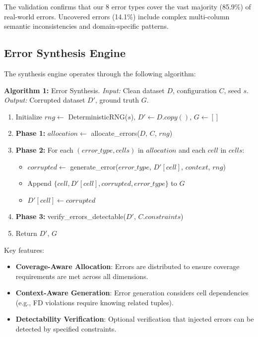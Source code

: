 \documentclass[11pt,a4paper]{article}
\begin{document}
The validation confirms that our 8 error types cover the vast majority (85.9\%) of real-world errors. Uncovered errors (14.1\%) include complex multi-column semantic inconsistencies and domain-specific patterns.

\subsection{Error Synthesis Engine}

The synthesis engine operates through the following algorithm:

\textbf{Algorithm 1:} Error Synthesis. \textit{Input:} Clean dataset $D$, configuration $C$, seed $s$. \textit{Output:} Corrupted dataset $D'$, ground truth $G$.
\begin{enumerate}
    \item Initialize $rng \leftarrow$ DeterministicRNG($s$), $D' \leftarrow D.copy()$, $G \leftarrow []$
    \item \textbf{Phase 1:} $allocation \leftarrow$ allocate\_errors($D$, $C$, $rng$)
    \item \textbf{Phase 2:} For each $(error\_type, cells)$ in $allocation$ and each $cell$ in $cells$:
    \begin{itemize}
        \item $corrupted \leftarrow$ generate\_error($error\_type$, $D'[cell]$, $context$, $rng$)
        \item Append $\{cell, D'[cell], corrupted, error\_type\}$ to $G$
        \item $D'[cell] \leftarrow corrupted$
    \end{itemize}
    \item \textbf{Phase 3:} verify\_errors\_detectable($D'$, $C.constraints$)
    \item Return $D'$, $G$
\end{enumerate}

Key features:
\begin{itemize}
    \item \textbf{Coverage-Aware Allocation}: Errors are distributed to ensure coverage requirements are met across all dimensions.
    \item \textbf{Context-Aware Generation}: Error generation considers cell dependencies (e.g., FD violations require knowing related tuples).
    \item \textbf{Detectability Verification}: Optional verification that injected errors can be detected by specified constraints.
\end{itemize}
\end{document}
